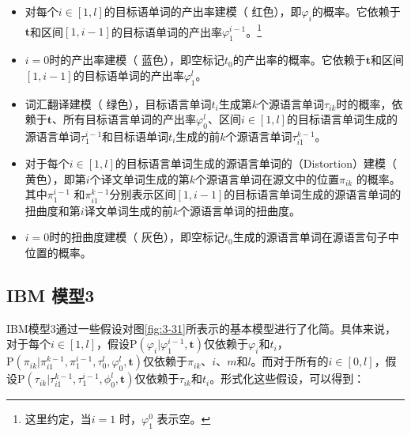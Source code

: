 \begin{itemize}
\vspace{0.5em}
\item 对每个$i\in[1,l]$的目标语单词的产出率建模（{\color{red!70} 红色}），即$\varphi_i$的概率。它依赖于$\mathbf{t}$和区间$[1,i-1]$的目标语单词的产出率$\varphi_1^{i-1}$。\footnote{这里约定，当$i=1$ 时，$\varphi_1^0$ 表示空。}
\vspace{0.5em}
\item $i=0$时的产出率建模（{\color{blue!70} 蓝色}），即空标记$t_0$的产出率的概率。它依赖于$\mathbf{t}$和区间$[1,i-1]$的目标语单词的产出率$\varphi_1^l$。
\vspace{0.5em}
\item 词汇翻译建模（{\color{green!70} 绿色}），目标语言单词$t_i$生成第$k$个源语言单词$\tau_{ik}$时的概率，依赖于$\mathbf{t}$、所有目标语言单词的产出率$\varphi_0^l$、区间$i\in[1,l]$的目标语言单词生成的源语言单词$\tau_1^{i-1}$和目标语单词$t_i$生成的前$k$个源语言单词$\tau_{i1}^{k-1}$。
\vspace{0.5em}
\item 对于每个$i\in[1,l]$的目标语言单词生成的源语言单词的{\small{}}（Distortion）建模（{\color{yellow!70!black} 黄色}），即第$i$个译文单词生成的第$k$个源语言单词在源文中的位置$\pi_{ik}$ 的概率。其中$\pi_1^{i-1}$ 和$\pi_{i1}^{k-1}$分别表示区间$[1,i-1]$的目标语言单词生成的源语言单词的扭曲度和第$i$译文单词生成的前$k$个源语言单词的扭曲度。
\vspace{0.5em}
\item $i=0$时的扭曲度建模（{\color{gray!70} 灰色}），即空标记$t_0$生成的源语言单词在源语言句子中位置的概率。
\end{itemize}


\subsection{IBM 模型3}

\parinterval IBM模型3通过一些假设对图\ref{fig:3-31}所表示的基本模型进行了化简。具体来说，对于每个$i\in[1,l]$，假设$\textrm{P}(\varphi_i |\varphi_1^{i-1},\mathbf{t})$仅依赖于$\varphi_i$和$t_i$，$\textrm{P}(\pi_{ik}|\pi_{i1}^{k-1},\pi_1^{i-1},\tau_0^l,\varphi_0^l,\mathbf{t})$仅依赖于$\pi_{ik}$、$i$、$m$和$l$。而对于所有的$i\in[0,l]$，假设$\textrm{P}(\tau_{ik}|\tau_{i1}^{k-1},\tau_1^{i-1},\phi_0^l,\mathbf{t})$仅依赖于$\tau_{ik}$和$t_i$。形式化这些假设，可以得到：

